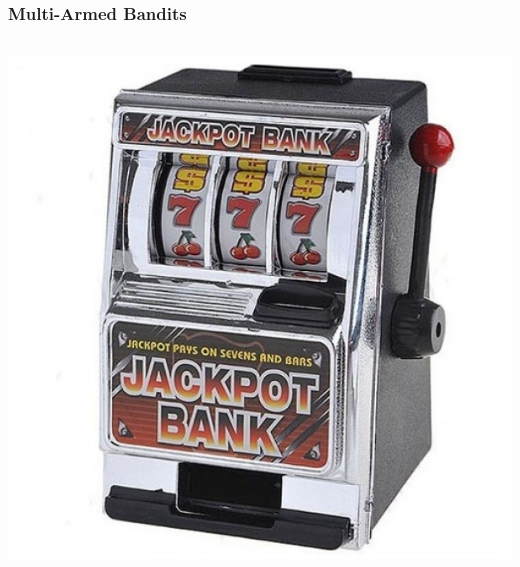 \documentclass[fullscreen=true, bookmarks=true, hyperref={pdfencoding=unicode}]{beamer}
\begin{document}

\begin{frame}
  \frametitle{Multi-Armed Bandits}

  \begin{columns}
      \begin{column}{.25\paperwidth}
        \begin{center}
          \includegraphics[keepaspectratio,
                           width=.2\paperwidth]{data-kopilkabandit.jpg}


\end{center}
\end{column}
\end{columns}
\end{frame}
\end{document}
